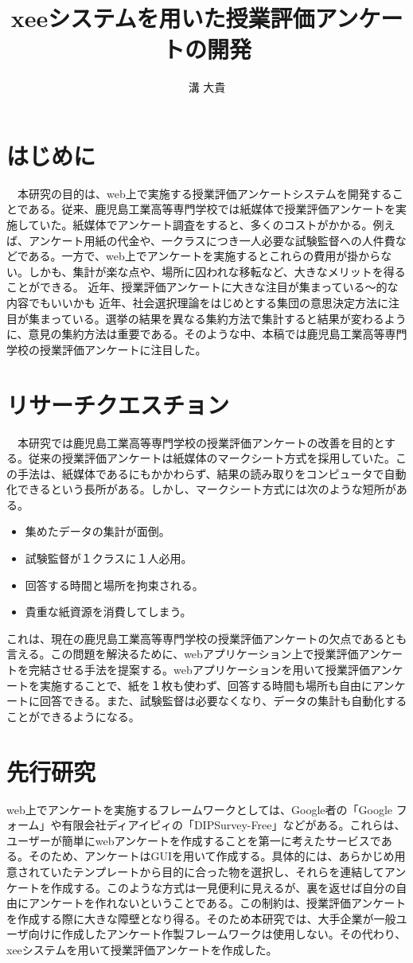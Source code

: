 \documentclass[11pt,a4paper]{jsarticle}
\title{xeeシステムを用いた授業評価アンケートの開発}
\author{溝 大貴}
\begin{document}
\maketitle
%
%
\section{はじめに}
　本研究の目的は、web上で実施する授業評価アンケートシステムを開発することである。従来、鹿児島工業高等専門学校では紙媒体で授業評価アンケートを実施していた。紙媒体でアンケート調査をすると、多くのコストがかかる。例えば、アンケート用紙の代金や、一クラスにつき一人必要な試験監督への人件費などである。一方で、web上でアンケートを実施するとこれらの費用が掛からない。しかも、集計が楽な点や、場所に囚われな移転など、大きなメリットを得ることができる。
近年、授業評価アンケートに大きな注目が集まっている～的な内容でもいいかも
近年、社会選択理論をはじめとする集団の意思決定方法に注目が集まっている。選挙の結果を異なる集約方法で集計すると結果が変わるように、意見の集約方法は重要である。そのような中、本稿では鹿児島工業高等専門学校の授業評価アンケートに注目した。

\section{リサーチクエスチョン}
　本研究では鹿児島工業高等専門学校の授業評価アンケートの改善を目的とする。従来の授業評価アンケートは紙媒体のマークシート方式を採用していた。この手法は、紙媒体であるにもかかわらず、結果の読み取りをコンピュータで自動化できるという長所がある。しかし、マークシート方式には次のような短所がある。
\begin{itemize}
  \item 集めたデータの集計が面倒。 
  \item 試験監督が１クラスに１人必用。 
  \item 回答する時間と場所を拘束される。
  \item 貴重な紙資源を消費してしまう。
\end{itemize}
これは、現在の鹿児島工業高等専門学校の授業評価アンケートの欠点であるとも言える。この問題を解決るために、webアプリケーション上で授業評価アンケートを完結させる手法を提案する。webアプリケーションを用いて授業評価アンケートを実施することで、紙を１枚も使わず、回答する時間も場所も自由にアンケートに回答できる。また、試験監督は必要なくなり、データの集計も自動化することができるようになる。
\section{先行研究}
web上でアンケートを実施するフレームワークとしては、Google者の「Google フォーム」や有限会社ディアイピィの「DIPSurvey-Free」などがある。これらは、ユーザーが簡単にwebアンケートを作成することを第一に考えたサービスである。そのため、アンケートはGUIを用いて作成する。具体的には、あらかじめ用意されていたテンプレートから目的に合った物を選択し、それらを連結してアンケートを作成する。このような方式は一見便利に見えるが、裏を返せば自分の自由にアンケートを作れないということである。この制約は、授業評価アンケートを作成する際に大きな障壁となり得る。そのため本研究では、大手企業が一般ユーザ向けに作成したアンケート作製フレームワークは使用しない。その代わり、xeeシステムを用いて授業評価アンケートを作成した。
\end{document}
